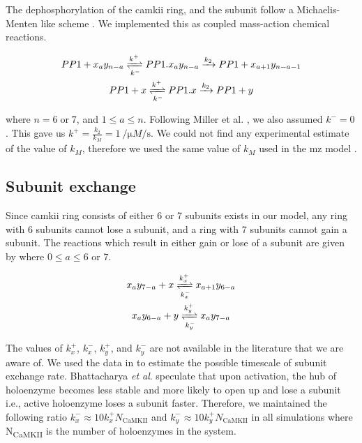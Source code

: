 \documentclass[9pt,lineno]{elife}
\newcommand\SUB[2]{#1\textsubscript{#2}}
\begin{document}
{The dephosphorylation of the \gls{camkii} ring, and the subunit follow a
Michaelis-Menten like scheme . We implemented this 
as coupled mass-action chemical reactions.

\begin{equation}\label{eq:dephosphorylation} 
    \begin{gathered} 
        PP1 + x_ay_{n-a} \xrightleftharpoons[k^-]{k^+} PP1.x_ay_{n-a} 
            \xrightarrow{k_2} PP1 + x_{a+1}y_{n-a-1} \\ 
        PP1 + x \xrightleftharpoons[k^-]{k^+} PP1.x \xrightarrow{k_2} PP1 + y 
    \end{gathered}
\end{equation}

\noindent where $n=6\;\text{or}\;7$, and $1\le a \le n$. Following Miller et al.
\citep{miller_stability_2005}, we also assumed $k^-=0$. This gave us
$k^+=\frac{k_2}{k_M}=\SI{1}{\per\micro M\per\second}$. We could not find any
experimental estimate of the value of $k_M$, therefore we used the same value of $k_M$ 
used in the \gls{mz} model \citep{miller_stability_2005}.

\subsection{Subunit exchange}\label{subunit exchange} 

Since \gls{camkii} ring consists of either 6 or 7 subunits exists in our model,
any ring with 6 subunits cannot lose a subunit, and a ring with 7 subunits
cannot gain a subunit. The reactions which result in either gain or lose of a
subunit are given by  where $0\le a \le 6\text{ or }7$.

\begin{equation}\label{eq:losegainx}
    \begin{gathered}
    x_ay_{7-a} + x \xrightleftharpoons[k^-_x]{k^+_x} x_{a+1}y_{6-a} \\
    x_ay_{6-a} + y \xrightleftharpoons[k^-_y]{k^+_y} x_{a}y_{7-a}
    \end{gathered}
\end{equation}

The values of $k_x^+$, $k_x^-$, $k_y^+$, and $k_y^-$ are not available in the
literature that we are aware of. We used the data in
\citep{stratton_activation-triggered_2014} to estimate the possible timescale of
subunit exchange rate. Bhattacharya \textit{et al}.
\citep{bhattacharyya_molecular_2016} speculate that upon activation, the hub of
holoenzyme becomes less stable and more likely to open up and lose a subunit
i.e., active holoenzyme loses a subunit faster. Therefore, we maintained the
following ratio \(k_x^- \approx 10 k_x^+ N_{\text{CaMKII}}\) and \(k_y^- \approx
10 k_y^+ N_{\text{CaMKII}}\) in all simulations where \SUB{N}{CaMKII} is the
number of holoenzymes in the system.  

}
\end{document}

